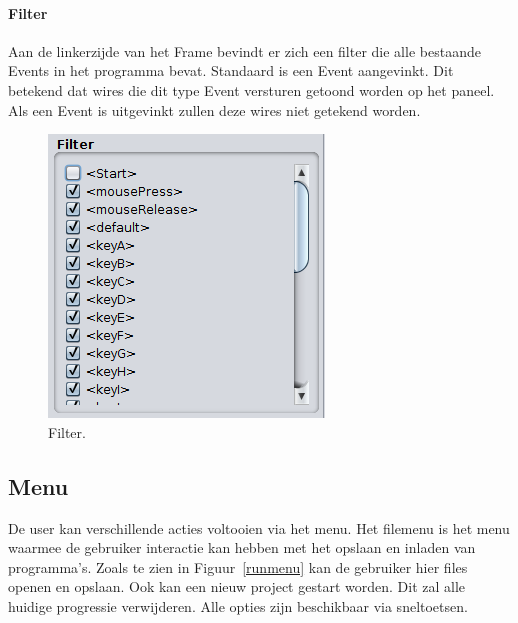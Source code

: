 \documentclass[]{article}
\begin{document}
\paragraph{Filter}
Aan de linkerzijde van het Frame bevindt er zich een filter die alle bestaande Events in het programma bevat. Standaard is een Event aangevinkt. Dit betekend dat wires die dit type Event versturen getoond worden op het paneel. Als een Event is uitgevinkt zullen deze wires niet getekend worden.
\begin{figure}[H]
  \centering
\includegraphics[scale=0.4]{Documentatie/images/filter}
  \caption{Filter.} \label{filterdoc}
\end{figure}

\subsection{Menu}
De user kan verschillende acties voltooien via het menu. Het filemenu is het menu waarmee de gebruiker interactie kan hebben met het opslaan en inladen van programma's. Zoals te zien in Figuur~\ref{runmenu} kan de gebruiker hier files openen en opslaan. Ook kan een nieuw project gestart worden. Dit zal alle huidige progressie verwijderen. Alle opties zijn beschikbaar via sneltoetsen.
\end{document}
